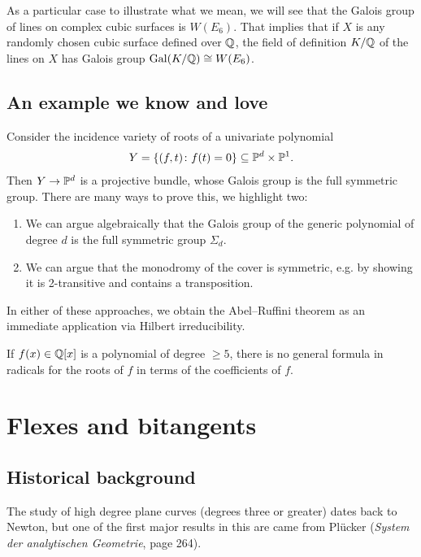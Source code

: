 \documentclass[11pt]{amsart}
\begin{document}
As a particular case to illustrate what we mean, we will see that the Galois group of lines on complex cubic surfaces is $W(E_6)$. That implies that if $X$ is any randomly chosen cubic surface defined over $\Q$, the field of definition $K/\Q$ of the lines on $X$ has Galois group $\Gal(K/\Q) \cong W(E_6)$.

\subsection{An example we know and love}

Consider the incidence variety of roots of a univariate polynomial
\begin{align*}
    Y = \left\{ (f,t) \colon f(t) = 0 \right\} \subseteq \P^d \times \P^1.
\end{align*}
Then $Y \to \P^d$ is a projective bundle, whose Galois group is the full symmetric group. There are many ways to prove this, we highlight two:
\begin{enumerate}
    \item We can argue algebraically that the Galois group of the generic polynomial of degree $d$ is the full symmetric group $\Sigma_d$.
    \item We can argue that the monodromy of the cover is symmetric, e.g. by showing it is 2-transitive and contains a transposition.
\end{enumerate}

In either of these approaches, we obtain the Abel--Ruffini theorem as an immediate application via Hilbert irreducibility.

\begin{theorem} If $f(x) \in \Q[x]$ is a polynomial of degree $\ge 5$, there is no general formula in radicals for the roots of $f$ in terms of the coefficients of $f$.
\end{theorem}

\section{Flexes and bitangents}\label{sec:flexes}

\subsection{Historical background}

The study of high degree plane curves (degrees three or greater) dates back to Newton, but one of the first major results in this are came from Pl\"{u}cker (\textit{System der analytischen Geometrie}, page 264).
\end{document}
